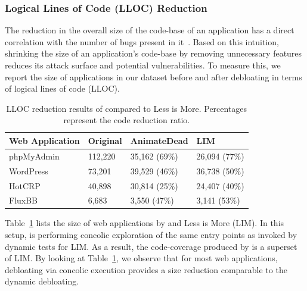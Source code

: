 {\subsubsection*{Logical Lines of Code (LLOC) Reduction} 
The reduction in the overall size of the code-base of an application has a direct correlation with the number of bugs present in it~\cite{mcconnell2004code}. 
Based on this intuition, shrinking the size of an application's code-base by removing unnecessary features reduces its attack surface and potential vulnerabilities. 
To measure this, we report the size of applications in our dataset before and after debloating in terms of logical lines of code (LLOC). 

\begin{table}[]
    \caption{LLOC reduction results of \animatedead{} compared to Less is More. Percentages represent the code reduction ratio.}
    \label{tab:lloc_reduction}
    \centering
    \begin{adjustbox}{max width=\columnwidth}
        \begin{tabular}{|l|l|l|l|}
        \hline
        \textbf{Web Application} & \textbf{Original} & \textbf{AnimateDead} & \textbf{LIM}  \\ \hline
        phpMyAdmin               & 112,220           & 35,162 (69\%)        & 26,094 (77\%) \\ \hline
        WordPress                & 73,201            & 39,529 (46\%)        & 36,738 (50\%) \\ \hline
        HotCRP                   & 40,898            & 30,814 (25\%)        & 24,407 (40\%) \\ \hline
        FluxBB                   & 6,683             & 3,550 (47\%)         & 3,141 (53\%)  \\ \hline
        \end{tabular}
    \end{adjustbox}
\end{table}

Table~\ref{tab:lloc_reduction} lists the size of web applications by \animatedead{} and Less is More (LIM). 
In this setup, \animatedead{} is performing concolic exploration of the same entry points as invoked by dynamic tests for LIM. 
As a result, the code-coverage produced by \animatedead{} is a superset of LIM. 
By looking at Table~\ref{tab:lloc_reduction}, we observe that for most web applications, debloating via concolic execution provides a size reduction comparable to the dynamic debloating. 

}
